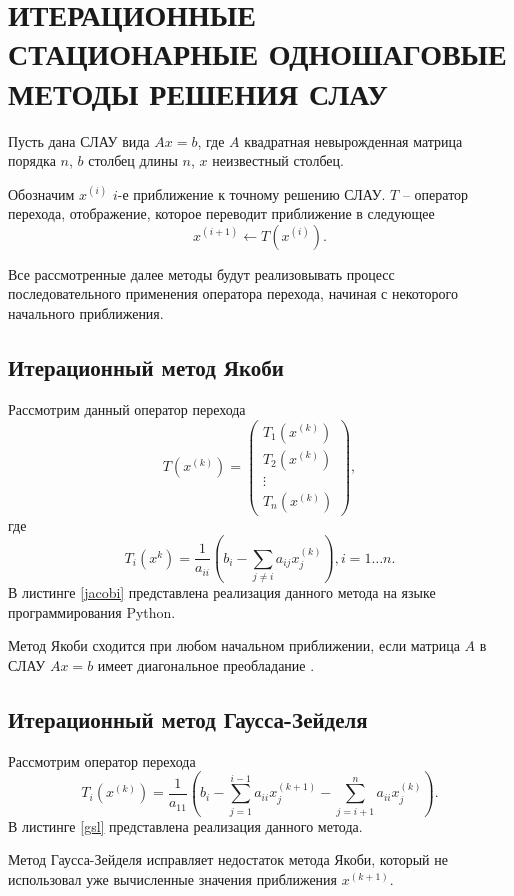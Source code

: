 \documentclass[14pt]{extarticle}
\begin{document}
    \section{ИТЕРАЦИОННЫЕ СТАЦИОНАРНЫЕ ОДНОШАГОВЫЕ МЕТОДЫ РЕШЕНИЯ СЛАУ}
    Пусть дана СЛАУ вида $Ax = b$, где  $A$ квадратная невырожденная матрица порядка $n$,
     $b$ столбец длины $n$,  $x$ неизвестный столбец.

     Обозначим $x^{(i)}$ $i$-е приближение к точному решению СЛАУ.  $T$ -- оператор перехода,
     отображение, которое переводит приближение в следующее
      \[
     x^{(i + 1)} \leftarrow T(x^{(i)})
     .\] 

     Все рассмотренные далее методы будут реализовывать процесс последовательного применения оператора перехода, начиная
     с некоторого начального приближения.
     \subsection{Итерационный метод Якоби}
     Рассмотрим данный оператор перехода
     \[
     T(x^{(k)}) = \begin{pmatrix} 
     T_1(x^{(k)}) \\
     T_2(x^{(k)})\\
     \vdots\\
     T_{n}(x^{(k)})
     \end{pmatrix} 
     ,\] 
     где
     \[
     T_{i}(x^{k}) = \frac{1}{a_{ii}} (b_{i} - \sum_{j \neq i} a_{ij}x^{(k)}_{j}) ,i = 1\dots n
     .\] 
     В листинге \ref{jacobi} представлена реализация данного метода на языке программирования Python.
     
     Метод Якоби сходится при любом начальном приближении, если матрица $A$ в СЛАУ  $Ax=b$ 
     имеет диагональное преобладание \cite{book}.
     \subsection{Итерационный метод Гаусса-Зейделя}
     Рассмотрим оператор перехода
     \[
     T_{i}(x^{(k)}) = \frac{1}{a_{11}} (b_{i} - \sum_{j=1}^{i-1} a_{ii} x_{j}^{(k+1)} - \sum_{j=i+1}^{n} a_{ii} x_{j}^{(k)})
     .\] 
     В листинге \ref{gsl} представлена реализация данного метода.
     
     Метод Гаусса-Зейделя исправляет недостаток метода Якоби, который не использовал уже вычисленные 
     значения приближения $x^{(k+1)}$. 
\end{document}
